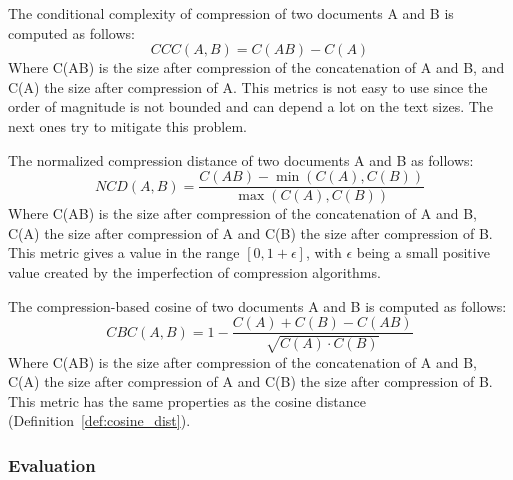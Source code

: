\begin{definition}
  The conditional complexity of compression of two documents A and B is computed as follows:
  \begin{equation}
    CCC(A, B) = C(AB) - C(A)
  \end{equation}
  Where C(AB) is the size after compression of the concatenation of A and B, and C(A) the size after compression of A.
  This metrics is not easy to use since the order of magnitude is not bounded and can depend a lot on the text sizes.
  The next ones try to mitigate this problem.
\end{definition}

\begin{definition}
  The normalized compression distance of two documents A and B as follows:
  \begin{equation}
    NCD(A, B) = \frac{C(AB) - \min(C(A), C(B))}{\max(C(A), C(B))}
  \end{equation}
  Where C(AB) is the size after compression of the concatenation of A and B, C(A) the size after compression of A and C(B) the size after compression of B.
  This metric gives a value in the range $\left[0, 1+\epsilon\right]$, with $\epsilon$ being a small positive value created by the imperfection of compression algorithms.
\end{definition}

\begin{definition}
  The compression-based cosine of two documents A and B is computed as follows:
  \begin{equation}
    CBC(A, B) = 1 - \frac{C(A) + C(B) - C(AB)}{\sqrt{C(A) \cdot C(B)}}
  \end{equation}
  Where C(AB) is the size after compression of the concatenation of A and B, C(A) the size after compression of A and C(B) the size after compression of B.
  This metric has the same properties as the cosine distance (Definition~\ref{def:cosine_dist}).
\end{definition}


\subsubsection{Evaluation}

